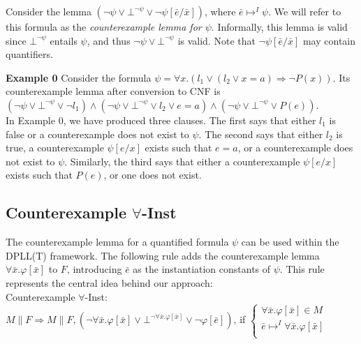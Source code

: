 \documentclass{llncs}
\begin{document}
Consider the lemma $( \neg \psi \vee \bot^{\neg \psi} \vee \neg \psi[\bar{e}/\bar{x}])$, where $\bar{e} \mapsto^I \psi$.
We will refer to this formula as the \emph{counterexample lemma for $\psi$}.
Informally, this lemma is valid since $\bot^{\neg \psi}$ entails $\psi$, and thus $\neg \psi \vee \bot^{\neg \psi}$ is valid.
Note that $\neg \psi[\bar{e}/\bar{x}]$ may contain quantifiers.

{\bf Example 0}
Consider the formula $\psi = \forall x. ( l_1 \vee ( l_2 \vee x = a ) \Rightarrow \neg P( x ) )$.
Its counterexample lemma after conversion to CNF is $( \neg \psi \vee \bot^{\neg \psi} \vee \neg l_1 ) \wedge ( \neg \psi \vee \bot^{\neg \psi} \vee l_2 \vee e = a ) \wedge ( \neg \psi \vee \bot^{\neg \psi} \vee P( e ) ) $. \\

In Example 0, we have produced three clauses.
The first says that either $l_1$ is false or a counterexample does not exist to $\psi$.
The second says that either $l_2$ is true, a counterexample $\psi[e/x]$ exists such that $e = a$, or a counterexample does not exist to $\psi$. 
Similarly, the third says that either a counterexample $\psi[e/x]$ exists such that $P( e )$, or one does not exist.

\subsection{Counterexample $\forall$-Inst}

The counterexample lemma for a quantified formula $\psi$ can be used within the DPLL(T) framework.
The following rule adds the counterexample lemma $\forall \bar{x}. \varphi[ \bar{ x } ]$ to $F$, introducing $\bar{e}$ as the instantiation constants of $\psi$.
This rule represents the central idea behind our approach: \\

\noindent Counterexample $\forall$-Inst: \\

$M \parallel F \Longrightarrow M \parallel F, (\neg \forall \bar{x}. \varphi[ \bar{x} ] \vee \bot^{\neg \forall \bar{x}. \varphi[ \bar{x} ]} \vee \neg \varphi[ \bar{ e } ])$, if   
$\begin{cases}
  \forall \bar{x}. \varphi[ \bar{ x } ] \in M \\
  \bar{ e } \mapsto^I \forall \bar{x}. \varphi[ \bar{ x } ] \\
\end{cases}$ \\
\end{document}
